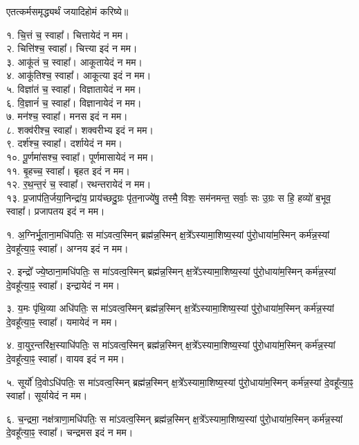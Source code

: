 
एतत्कर्मसमृद्ध्यर्थं जयादिहोमं करिष्ये॥

१. चि॒त्तं च॒ स्वाहा᳚। चित्तायेदं न मम।\\
२. चित्ति॑श्च॒ स्वाहा᳚। चित्त्या इदं न मम।\\
३. आकू॑तं च॒ स्वाहा᳚। आकूतायेदं न मम।\\
४. आकू॑तिश्च॒ स्वाहा᳚। आकूत्या इदं न मम।\\
५. विज्ञा॑तं च॒ स्वाहा᳚। विज्ञातायेदं न मम।\\
६. वि॒ज्ञानं॑ च॒ स्वाहा᳚। विज्ञानायेदं न मम।\\
७. मन॑श्च॒ स्वाहा᳚। मनस इदं न मम।\\
८. शक्व॑रीश्च॒ स्वाहा᳚। शक्वरीभ्य इदं न मम।\\
९. दर्श॑श्च॒ स्वाहा᳚। दर्शायेदं न मम।\\
१०. पू॒र्णमा॑सश्च॒ स्वाहा᳚। पूर्णमासायेदं न मम।\\
११. बृ॒हच्च॒ स्वाहा᳚। बृहत इदं न मम।\\
१२. र॒थ॒न्त॒रं च॒ स्वाहा᳚। रथन्तरायेदं न मम।\\
१३. प्र॒जाप॑ति॒र्जया॒निन्द्रा॑य॒ प्राय॑च्छदु॒ग्रः पृ॑त॒नाज्ये॑षु॒ तस्मै॒ विशः॒ सम॑नमन्त॒ सर्वाः॒ सः उ॒ग्रः स हि॒ हव्यो॑ ब॒भूव॒ स्वाहा᳚। प्रजापतय इदं न मम।\\

\clearpage

१. अ॒ग्निर्भू॒ताना॒मधि॑पतिः॒ स मा॑ऽवत्व॒स्मिन् ब्रह्म॑न्न॒स्मिन् क्ष॒त्रे᳚ऽस्यामा॒शिष्य॒स्यां पु॑रो॒धाया॑म॒स्मिन् कर्म॑न्न॒स्यां दे॒वहू᳚त्या॒ꣴ॒ स्वाहा᳚। अग्नय इदं न मम।

२. इन्द्रो᳚ ज्ये॒ष्ठाना॒मधि॑पतिः॒ स मा॑ऽवत्व॒स्मिन् ब्रह्म॑न्न॒स्मिन् क्ष॒त्रे᳚ऽस्यामा॒शिष्य॒स्यां पु॑रो॒धाया॑म॒स्मिन् कर्म॑न्न॒स्यां दे॒वहू᳚त्या॒ꣴ॒ स्वाहा᳚। इन्द्रायेदं न मम।

३. य॒मः पृ॑थि॒व्या अधि॑पतिः॒ स मा॑ऽवत्व॒स्मिन् ब्रह्म॑न्न॒स्मिन् क्ष॒त्रे᳚ऽस्यामा॒शिष्य॒स्यां पु॑रो॒धाया॑म॒स्मिन् कर्म॑न्न॒स्यां दे॒वहू᳚त्या॒ꣴ॒ स्वाहा᳚। यमायेदं न मम।

४. वा॒युर॒न्तरि॑क्ष॒स्याधि॑पतिः॒ स मा॑ऽवत्व॒स्मिन् ब्रह्म॑न्न॒स्मिन् क्ष॒त्रे᳚ऽस्यामा॒शिष्य॒स्यां पु॑रो॒धाया॑म॒स्मिन् कर्म॑न्न॒स्यां दे॒वहू᳚त्या॒ꣴ॒ स्वाहा᳚। वायव इदं न मम।

५. सूर्यो॑ दि॒वोऽधि॑पतिः॒ स मा॑ऽवत्व॒स्मिन् ब्रह्म॑न्न॒स्मिन् क्ष॒त्रे᳚ऽस्यामा॒शिष्य॒स्यां पु॑रो॒धाया॑म॒स्मिन् कर्म॑न्न॒स्यां दे॒वहू᳚त्या॒ꣴ॒ स्वाहा᳚। सूर्यायेदं न मम।

६. च॒न्द्रमा॒ नक्ष॑त्राणा॒मधि॑पतिः॒ स मा॑ऽवत्व॒स्मिन् ब्रह्म॑न्न॒स्मिन् क्ष॒त्रे᳚ऽस्यामा॒शिष्य॒स्यां पु॑रो॒धाया॑म॒स्मिन् कर्म॑न्न॒स्यां दे॒वहू᳚त्या॒ꣴ॒ स्वाहा᳚। चन्द्रमस इदं न मम।

